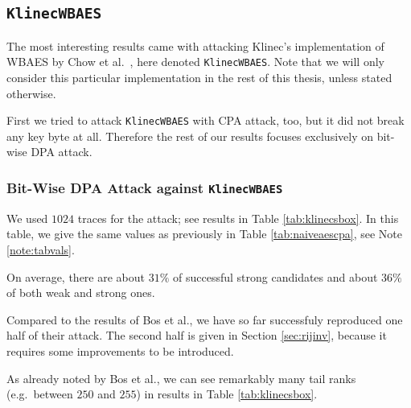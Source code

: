 \subsection{\tt KlinecWBAES}
\label{sec:klinecwbaes}

The most interesting results came with attacking Klinec's implementation \cite{klinec2013implementation} of WBAES by Chow et al.\ \cite{chow2002aes}, here denoted {\tt KlinecWBAES}. Note that we will only consider this particular implementation in the rest of this thesis, unless stated otherwise.

First we tried to attack {\tt KlinecWBAES} with CPA attack, too, but it did not break any key byte at all. Therefore the rest of our results focuses exclusively on bit-wise DPA attack.

\subsubsection{Bit-Wise DPA Attack against {\tt KlinecWBAES}}
	
	We used $1024$ traces for the attack; see results in Table \ref{tab:klinecsbox}. In this table, we give the same values as previously in Table \ref{tab:naiveaescpa}, see Note \ref{note:tabvals}.
	
	
	On average, there are about $31\%$ of successful strong candidates and about $36\%$ of both weak and strong ones.
	
	Compared to the results of Bos et al., we have so far successfuly reproduced one half of their attack. The second half is given in Section \ref{sec:rijinv}, because it requires some improvements to be introduced.
	
	\begin{note}
	\label{note:tailrank}
		As already noted by Bos et al., we can see remarkably many tail ranks (e.g.\ between $250$ and $255$) in results in Table \ref{tab:klinecsbox}.
	\end{note}





